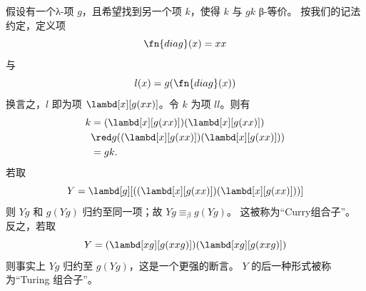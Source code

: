\documentclass[../../../include/open-logic-section]{subfiles}
\begin{document}

假设有一个λ-项 $g$，且希望找到另一个项 $k$，使得 $k$ 与 $gk$ β-等价。
按我们的记法约定，定义项
\[
\fn{diag}(x) = xx
\]
与
\[
l(x) = g(\fn{diag}(x))
\]
换言之，$l$ 即为项
$\lambd[x][g(xx)]$。令 $k$ 为项 $ll$。则有
\begin{align*}
k & = (\lambd[x][g(xx)])(\lambd[x][g(xx)]) \\
& \red  g((\lambd[x][g(xx)])(\lambd[x][g(xx)])) \\
& = gk.
\end{align*}
若取
\[
Y = \lambd[g][((\lambd[x][g(xx)])(\lambd[x][g(xx)]))]
\]
则 $Yg$ 和 $g(Yg)$ 归约至同一项；故 $Yg \equiv_\beta g(Yg)$。
这被称为“Curry组合子”。反之，若取
\[
Y = (\lambd[xg][g(xxg)])(\lambd[xg][g(xxg)])
\]
则事实上 $Yg$ 归约至 $g(Yg)$，这是一个更强的断言。
$Y$ 的后一种形式被称为“Turing 组合子”。
\end{document}

